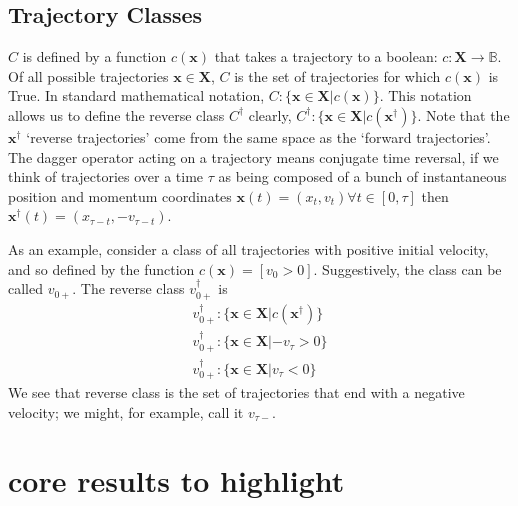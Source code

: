\documentclass[paper=a4, fontsize=10pt]{article} %
\numberwithin{equation}{section} %
\numberwithin{figure}{section} %
\numberwithin{table}{section} %
\def \x {\mathbf{x} }
\def\X {\mathbf{X} }
\begin{document}
\subsection{Trajectory Classes}
$C$ is defined by a function $c(\x)$ that takes a trajectory to a boolean: $c : \X \to  \mathbb{B}$. Of all possible trajectories $\x \in \X$, $C$ is the set of trajectories for which $c(\x)$ is True. In standard mathematical notation, $C: \{\x \in \X | c(\x)\}$. This notation allows us to define the reverse class $C^{\dagger}$ clearly, $C^{\dagger} : \{\x \in \X | c(\x^{\dagger}) \}$. Note that the $\x^\dagger$ `reverse trajectories' come from the same space as the `forward trajectories'. The dagger operator acting on a trajectory means conjugate time reversal, if we think of trajectories over a time $\tau$ as being composed of a bunch of instantaneous position and momentum coordinates $\x(t) = (x_t, v_t) \forall t \in [0,\tau]$ then $\x^{\dagger}(t) = (x_{\tau-t}, -v_{\tau-t})$. 

As an example, consider a class of all trajectories with positive initial velocity, and so defined by the function $c(\x) = \left[  v_0 > 0 \right]$. Suggestively, the class can be called  $v_{0+}$. The reverse class $v_{0+}^{\dagger}$ is 
\begin{align}
v_{0+}^{\dagger} : \{ \x \in \X | c(\x^\dagger)\} \\ 
v_{0+}^{\dagger} : \{ \x \in \X | -v_\tau > 0\} \\ 
v_{0+}^{\dagger} : \{ \x \in \X | v_\tau < 0\}
\end{align}
We see that reverse class is the set of trajectories that end with a negative velocity; we might, for example, call it $v_{\tau-}$.

\section{core results to highlight}
\end{document}
